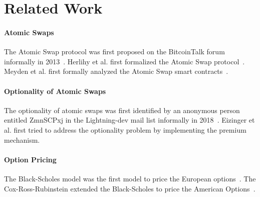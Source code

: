 \section{Related Work}
\label{sec:related_work}

\paragraph{Atomic Swaps}
The Atomic Swap protocol was first proposed on the BitcoinTalk forum informally in 2013~\cite{nolan2013alt}.
Herlihy et al. first formalized the Atomic Swap protocol~\cite{herlihy2018atomic}.
Meyden et al. first formally analyzed the Atomic Swap smart contracts~\cite{van2018specification}.

\paragraph{Optionality of Atomic Swaps}
The optionality of atomic swaps was first identified by an anonymous person entitled ZmnSCPxj in the Lightning-dev mail list informally in 2018~\cite{optionality-origin}.
Eizinger et al. first tried to address the optionality problem by implementing the premium mechanism\cite{first-attempt-optionality}.

\paragraph{Option Pricing}
The Black-Scholes model was the first model to price the European options~\cite{black1973pricing}.
The Cox-Ross-Rubinstein extended the Black-Scholes to price the American Options~\cite{cox1979option}.